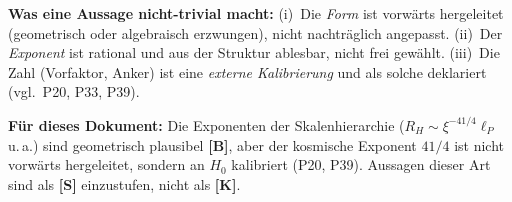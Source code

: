 \textbf{Was eine Aussage nicht-trivial macht:}
(i)~Die \emph{Form} ist vorwärts hergeleitet (geometrisch oder algebraisch
erzwungen), nicht nachträglich angepasst.
(ii)~Der \emph{Exponent} ist rational und aus der Struktur ablesbar,
nicht frei gewählt.
(iii)~Die Zahl (Vorfaktor, Anker) ist eine \emph{externe Kalibrierung}
und als solche deklariert (vgl.\ P20, P33, P39).

\textbf{Für dieses Dokument:} Die Exponenten der Skalenhierarchie
($R_H \sim \xi^{-41/4} \ell_P$ u.\,a.) sind geometrisch plausibel \textbf{[B]},
aber der kosmische Exponent $41/4$ ist nicht vorwärts hergeleitet, sondern an $H_0$ kalibriert (P20, P39).
Aussagen dieser Art sind als \textbf{[S]} einzustufen, nicht als \textbf{[K]}.
